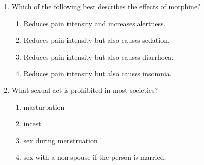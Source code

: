 \documentclass[12pt]{article}
\begin{document}
\begin{enumerate}[label=\arabic*.]
\item Which of the following best describes the effects of morphine?
\begin{enumerate}[label=(\alph*)]
    \item Reduces pain intensity and increases alertness.
    \item Reduces pain intensity but also causes sedation.
    \item Reduces pain intensity but also causes diarrhoea.
    \item Reduces pain intensity but also causes insomnia.
\end{enumerate}
\item What sexual act is prohibited in most societies?
\begin{enumerate}[label=(\alph*)]
    \item masturbation
    \item incest
    \item sex during menstruation
    \item sex with a non-spouse if the person is married.
\end{enumerate}
\end{enumerate}
\end{document}
